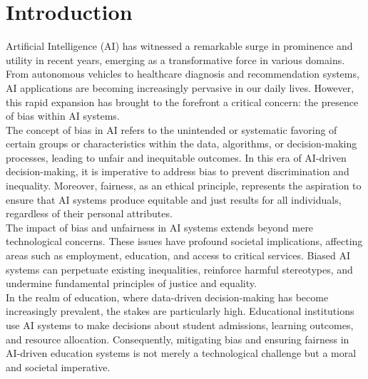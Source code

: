 \documentclass[12pt,a4paper,openright,twoside]{book}
\begin{document}
\tableofcontents   

\mainmatter

\chapter{Introduction}
\label{chap:introduction}

Artificial Intelligence (AI) has witnessed a remarkable surge in prominence and utility in recent years, emerging as a transformative force in various domains. From autonomous vehicles to healthcare diagnosis and recommendation systems, AI applications are becoming increasingly pervasive in our daily lives. However, this rapid expansion has brought to the forefront a critical concern: the presence of bias within AI systems.\\
The concept of bias in AI refers to the unintended or systematic favoring of certain groups or characteristics within the data, algorithms, or decision-making processes, leading to unfair and inequitable outcomes. In this era of AI-driven decision-making, it is imperative to address bias to prevent discrimination and inequality. Moreover, fairness, as an ethical principle, represents the aspiration to ensure that AI systems produce equitable and just results for all individuals, regardless of their personal attributes. \\
The impact of bias and unfairness in AI systems extends beyond mere technological concerns. These issues have profound societal implications, affecting areas such as employment, education, and access to critical services. Biased AI systems can perpetuate existing inequalities, reinforce harmful stereotypes, and undermine fundamental principles of justice and equality. \\
In the realm of education, where data-driven decision-making has become increasingly prevalent, the stakes are particularly high. Educational institutions use AI systems to make decisions about student admissions, learning outcomes, and resource allocation. Consequently, mitigating bias and ensuring fairness in AI-driven education systems is not merely a technological challenge but a moral and societal imperative. \\
\end{document}
